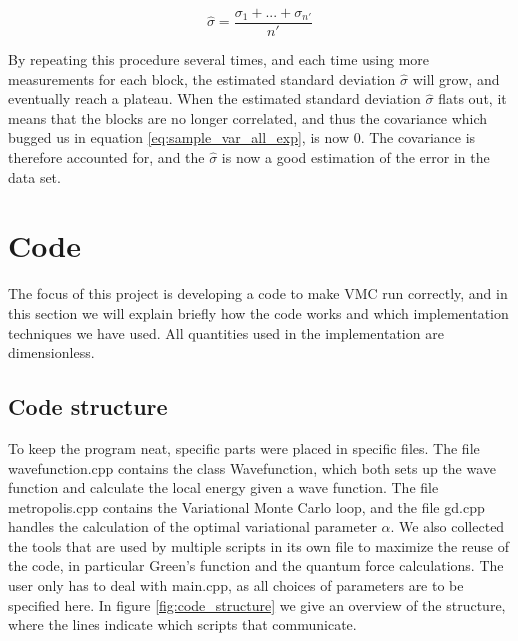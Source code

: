\documentclass[norsk,a4paper,12pt]{article}
\begin{document}
 \begin{equation}
 \hat{\sigma} = \frac{\sigma_1 + ... + \sigma_{n'}}{n'}
 \end{equation}
 
By repeating this procedure several times, and each time using more measurements for each block, the estimated standard deviation $\hat{\sigma}$ will grow, and eventually reach a plateau. When the estimated standard deviation $\hat{\sigma}$ flats out, it means that the blocks are no longer correlated, and thus the covariance which bugged us in equation \ref{eq:sample_var_all_exp}, is now 0. The covariance is therefore accounted for, and the $\hat{\sigma}$ is now a good estimation of the error in the data set.


\section{Code} \label{sec:code}
The focus of this project is developing a code to make VMC run correctly, and in this section we will explain briefly how the code works and which implementation techniques we have used. All quantities used in the implementation are dimensionless. 

\subsection{Code structure}
To keep the program neat, specific parts were placed in specific files. The file wavefunction.cpp contains the class Wavefunction, which both sets up the wave function and calculate the local energy given a wave function. The file metropolis.cpp contains the Variational Monte Carlo loop, and the file gd.cpp handles the calculation of the optimal variational parameter $\alpha$. We also collected the tools that are used by multiple scripts in its own file to maximize the reuse of the code, in particular Green's function and the quantum force calculations. The user only has to deal with main.cpp, as all choices of parameters are to be specified here.  In figure \ref{fig:code_structure} we give an overview of the structure, where the lines indicate which scripts that communicate. 
\end{document}

